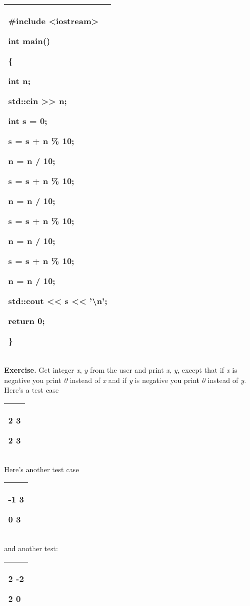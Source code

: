 \documentclass[
]{article}
\begin{document}
\begin{longtable}[]{@{}l@{}}
\toprule
\endhead
\begin{minipage}[t]{0.97\columnwidth}\raggedright
\#include \textless iostream\textgreater{}

int main()

\{

int n;

std::cin \textgreater\textgreater{} n;

int s = 0;

s = s + n \% 10;

n = n / 10;

s = s + n \% 10;

n = n / 10;

s = s + n \% 10;

n = n / 10;

s = s + n \% 10;

n = n / 10;

std::cout \textless\textless{} s \textless\textless{}
'\textbackslash n';

return 0;

\}\strut
\end{minipage}\tabularnewline
\bottomrule
\end{longtable}

\textbf{Exercise.} Get integer \emph{x}, \emph{y} from the user and
print \emph{x}, \emph{y}, except that if \emph{x }is negative you print
\emph{0} instead of \emph{x} and if \emph{y} is negative you print
\emph{0} instead of \emph{y}. Here's a test case

\begin{longtable}[]{@{}l@{}}
\toprule
\endhead
\begin{minipage}[t]{0.97\columnwidth}\raggedright
2 3

2 3\strut
\end{minipage}\tabularnewline
\bottomrule
\end{longtable}

Here's another test case

\begin{longtable}[]{@{}l@{}}
\toprule
\endhead
\begin{minipage}[t]{0.97\columnwidth}\raggedright
-1 3

0 3\strut
\end{minipage}\tabularnewline
\bottomrule
\end{longtable}

and another test:

\begin{longtable}[]{@{}l@{}}
\toprule
\endhead
\begin{minipage}[t]{0.97\columnwidth}\raggedright
2 -2

2 0\strut
\end{minipage}\tabularnewline
\bottomrule
\end{longtable}
\end{document}

